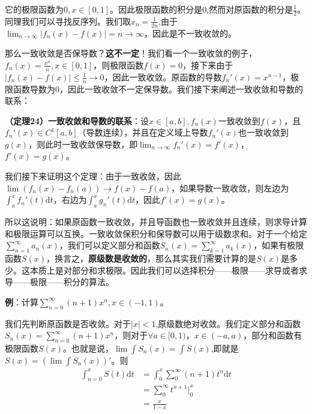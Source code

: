\documentclass{ctexart}
\let\oldtextbf\textbf
\renewcommand{\textbf}[1]{\textcolor{brown!50!red}{\oldtextbf{#1}}}
\begin{document}
它的极限函数为$0,x\in[0,1]$。因此极限函数的积分是0,然而对原函数的积分是$\frac{1}{2}$。同理我们可以寻找反序列。我们取$x_n=\frac{1}{2n}$,由于$\lim_{n\to\infty} |f_n(x)-f(x)|=n\to\infty$，因此是不一致收敛的。

那么一致收敛是否保导数？\textbf{\color{brown!50!red}这不一定}！我们看一个一致收敛的例子，$f_n(x)=\frac{x^n}{n},x\in[0,1]$，则极限函数$f(x)=0$，接下来由于$|f_n(x)-f(x)|\leq\frac
{1}{n}\to 0$，因此一致收敛。原函数的导数$f_n'(x)=x^{n-1}$，极限函数导数为0，因此一致收敛不一定保导数。我们接下来阐述一致收敛和导数的联系：
\begin{tcolorbox}[
    colback=bac2,     %
    colframe=fra2,   %
    coltitle=white,             %
    coltext=tex2,
    title=一致收敛保导数,
    fonttitle=\bfseries,        %
arc=3mm,                     %
breakable
]
\textbf{\color{brown!50!red}（定理24）一致收敛和导数的联系}：设$x\in[a,b],f_n(x)$一致收敛到$f(x)$，且$f_n'(x)\in C^1[a,b]$（导数连续），并且在定义域上导数$f_n'(x)$也一致收敛到$g(x)$，则此时一致收敛保导数，即$\lim_{n\to\infty}f_n'(x)=f'(x)$，$f'(x)=g(x)$。
\end{tcolorbox}

我们接下来证明这个定理：由于一致收敛，因此$\lim(f_n(x)-f_n(a))\to f(x)-f(a)$，如果导数一致收敛，则左边为$\int_a^x f_n'(t)\mathrm{d}t$，右边为$\int_a^x g_n'(t)\mathrm{d}t$，因此$f'(x)=g(x)$。

所以这说明：如果原函数一致收敛，并且导函数也一致收敛并且连续，则求导计算和极限运算可以互换。一致收敛保积分和保导数可以用于级数求和。对于一个给定$\sum_{n=1}^\infty a_n(x)$，我们可以定义部分和函数$S_n(x)=\sum_{k=1}^\infty a_k(x)$，如果有极限函数$S(x)$，换言之，\textbf{\color{brown!50!red}原级数是收敛的}，那么其实我们需要计算的是$S(x)$是多少。这本质上是对部分和求极限。因此我们可以选择积分——极限——求导或者求导——极限——积分的算法。

\textbf{\color{brown!50!red}例}：计算$\sum_{n=0}^\infty (n+1)x^n,x\in(-1,1)$。

我们先判断原函数是否收敛。对于$|x|<1$,原级数绝对收敛。我们定义部分和函数$S_n(x)=\sum_{n=0}^\infty (n+1)x^n$，则对于$\forall a\in[0,1)，x\in(-a,a)$，部分和函数有极限函数$S(x)$。也就是说，$ \lim \int S_n(x)=\int S(x)$,即就是$S(x)=(\lim \int S_n(x))'$。则
\begin{align*}
    \int_{n=0}^x S(t)\mathrm{d}t&=\int_0^x  \sum_0^\infty  (n+1)t^n\mathrm{d}t\\
    &= \sum_0^\infty t^{n+1}|_0^x\\
    &=\frac{x}{1-x}
\end{align*}
\end{document}

